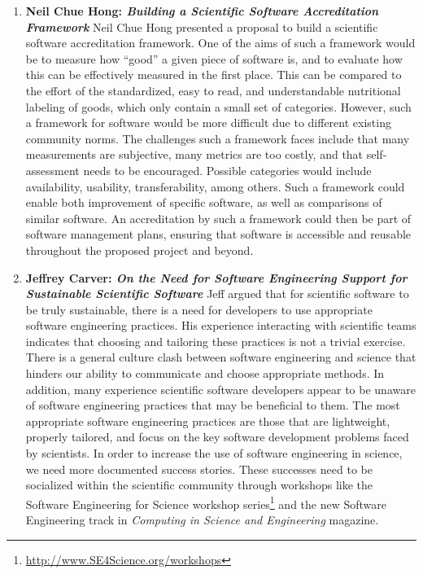 \documentclass[11pt, oneside]{amsart}
\begin{document}
\begin{enumerate}
\item \textbf{Neil Chue Hong: \textit{Building a Scientific Software
Accreditation Framework}} Neil Chue Hong presented a proposal to build a
scientific software accreditation framework. One of the aims of such a framework
would be to measure how ``good'' a given piece of software is, and to evaluate
how this can be effectively measured in the first place. This can be compared to
the effort of the standardized, easy to read, and understandable nutritional
labeling of goods, which only contain a small set of categories. However, such a
framework for software would be more difficult due to different existing
community norms. The challenges such a framework faces include that many
measurements are subjective, many metrics are too costly, and that
self-assessment needs to be encouraged. Possible categories would include
availability, usability, transferability, among others. Such a framework could
enable both improvement of specific software, as well as comparisons of similar
software. An accreditation by such a framework could then be part of software
management plans, ensuring that software is accessible and reusable throughout
the proposed project and beyond.

\item \textbf{Jeffrey Carver: \textit{On the Need for Software Engineering
Support for Sustainable Scientific Software}} Jeff argued that for scientific
software to be truly sustainable, there is a need for developers to use
appropriate software engineering practices. His experience interacting with
scientific teams indicates that choosing and tailoring these practices is not a
trivial exercise. There is a general culture clash between software engineering
and science that hinders our ability to communicate and choose appropriate
methods. In addition, many experience scientific software developers appear to
be unaware of software engineering practices that may be beneficial to them. The
most appropriate software engineering practices are those that are lightweight,
properly tailored, and focus on the key software development problems faced by
scientists. In order to increase the use of software engineering in science, we
need more documented success stories. These successes need to be socialized
within the scientific community through workshops like the Software Engineering
for Science workshop
series\footnote{\href{http://www.SE4Science.org/workshops}{http://www.SE4Science.org/workshops}}
and the new Software Engineering track in \textit{Computing in Science and
Engineering} magazine.


\end{enumerate}
\end{document}
